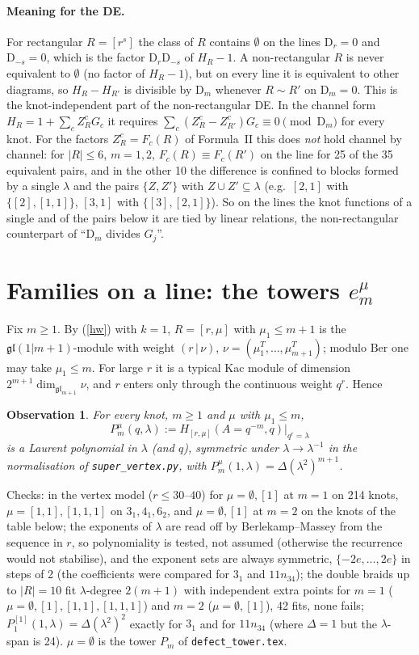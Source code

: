 \documentclass[11pt]{article}
\newtheorem{observation}{Observation}
\theoremstyle{remark}
\newcommand{\D}{\mathrm{D}}
\begin{document}
\paragraph{Meaning for the DE.}  For rectangular $R=[r^s]$ the class of $R$ contains $\emptyset$ on the lines
$\D_r=0$ and $\D_{-s}=0$, which is the factor $\D_r\D_{-s}$ of $H_R-1$.  A non-rectangular $R$ is never
equivalent to $\emptyset$ (no factor of $H_R-1$), but on every line it is equivalent to other diagrams, so
$H_R-H_{R'}$ is divisible by $\D_m$ whenever $R\sim R'$ on $\D_m=0$.  This is the knot-independent part of the
non-rectangular DE.  In the channel form $H_R=1+\sum_cZ_R^cG_c$ it requires
$\sum_c(Z_R^c-Z_{R'}^c)G_c\equiv0\pmod{\D_m}$ for every knot.  For the factors $Z_R^c=F_c(R)$ of Formula~II this does
\emph{not} hold channel by channel: for $|R|\le6$, $m=1,2$, $F_c(R)\equiv F_c(R')$ on the line for 25 of the 35
equivalent pairs, and in the other 10 the difference is confined to blocks formed by a single $\lambda$ and the pairs
$\{Z,Z'\}$ with $Z\cup Z'\subseteq\lambda$ (e.g.\ $[2,1]$ with $\{[2],[1,1]\}$, $[3,1]$ with $\{[3],[2,1]\}$).
So on the lines the knot functions of a single and of the pairs below it are tied by linear relations, the
non-rectangular counterpart of ``$\D_m$ divides $G_j$''.

\section{Families on a line: the towers $e^\mu_m$}

Fix $m\ge1$.  By (\ref{hw}) with $k=1$, $R=[r,\mu]$ with $\mu_1\le m+1$ is the $\mathfrak{gl}(1|m+1)$-module with
weight $(r\,|\,\nu)$, $\nu=(\mu^T_1,\dots,\mu^T_{m+1})$; modulo $\mathrm{Ber}$ one may take $\mu_1\le m$.  For large $r$
it is a typical Kac module of dimension $2^{m+1}\dim_{\mathfrak{gl}_{m+1}}\nu$, and $r$ enters only through the
continuous weight $q^r$.  Hence

\begin{observation}
For every knot, $m\ge1$ and $\mu$ with $\mu_1\le m$,
\[
  P^\mu_m(q,\lambda):=H_{[r,\mu]}(A=q^{-m},q)\big|_{q^r=\lambda}
\]
is a Laurent polynomial in $\lambda$ (and $q$), symmetric under $\lambda\to\lambda^{-1}$ in the normalisation of
\texttt{super\_vertex.py}, with $P^\mu_m(1,\lambda)=\Delta(\lambda^2)^{m+1}$.
\end{observation}
Checks: in the vertex model ($r\le30$--$40$) for $\mu=\emptyset,[1]$ at $m=1$ on 214 knots, $\mu=[1,1],[1,1,1]$ on
$3_1,4_1,6_2$, and $\mu=\emptyset,[1]$ at $m=2$ on the knots of the table below; the exponents of $\lambda$ are read off by
Berlekamp--Massey from the sequence in $r$, so polynomiality is tested, not assumed (otherwise the recurrence would not
stabilise), and the exponent sets are always symmetric, $\{-2e,\dots,2e\}$ in steps of 2 (the coefficients were
compared for $3_1$ and $11n_{34}$);
the double braids up to $|R|=10$ fit $\lambda$-degree $2(m+1)$ with independent extra points for $m=1$
($\mu=\emptyset,[1],[1,1],[1,1,1]$) and $m=2$ ($\mu=\emptyset,[1]$), 42 fits, none fails;
$P^{[1]}_1(1,\lambda)=\Delta(\lambda^2)^2$ exactly for $3_1$ and for $11n_{34}$ (where $\Delta=1$ but the
$\lambda$-span is 24).  $\mu=\emptyset$ is the tower $P_m$ of \texttt{defect\_tower.tex}.
\end{document}
